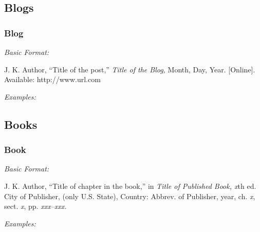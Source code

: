 \documentclass[10pt]{article}
\newcommand*{\guidelabel}[1]{\par\vspace{-4pt}\hspace*{22pt}\textit{#1}\par\vspace{-\parskip}}
\begin{document}
\subsection{Blogs}

\subsubsection{Blog}
\guidelabel{Basic Format:}
\begin{guideitems}
  \item J. K. Author, “Title of the post,” \textit{Title of the Blog,} Month, Day, Year. [Online]. Available: http://www.url.com
\end{guideitems}
\guidelabel{Examples:}
\begin{guideitems}
  \item {}
  \item {}
\end{guideitems}

\subsection{Books}

\subsubsection{Book}
\guidelabel{Basic Format:}
\begin{guideitems}
  \item J. K. Author, “Title of chapter in the book,” in \textit{Title of Published Book, x}th ed. City of Publisher, (only U.S. State), Country: Abbrev. of Publisher, year, ch. \textit{x}, sect. \textit{x}, pp. \textit{xxx–xxx.}
\end{guideitems}
\guidelabel{Examples:}
\begin{guideitems}
  \item {}
  \item {}
  \item {}
  \item {}
  \item {}
  \item {}
  \item {}
\end{guideitems}
\end{document}
